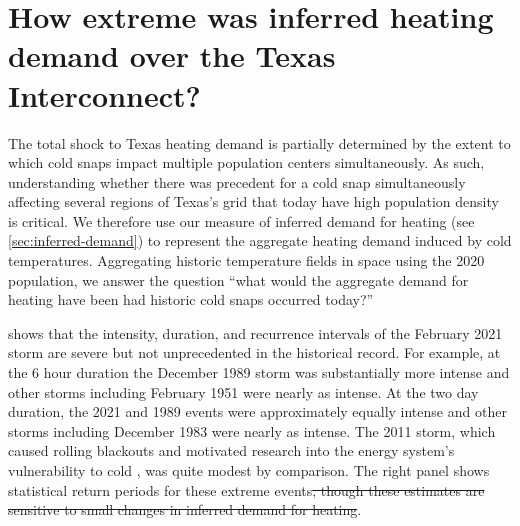 \documentclass[12pt]{iopart}
\providecommand{\DIFadd}[1]{{\protect\color{blue}\uwave{#1}}} %
\providecommand{\DIFdel}[1]{{\protect\color{red}\sout{#1}}}                      %
\providecommand{\DIFaddbegin}{} %
\providecommand{\DIFaddend}{} %
\providecommand{\DIFdelbegin}{} %
\providecommand{\DIFdelend}{} %
\newcommand{\DIFscaledelfig}{0.5}
\newlength{\DIFdelgraphicswidth} %
\newlength{\DIFdelgraphicsheight} %
\newcommand{\DIFaddincludegraphics}[2][]{{\color{blue}\fbox{\DIFOincludegraphics[#1]{#2}}}} %
\newcommand{\DIFdelincludegraphics}[2][]{%
\sbox{\DIFdelgraphicsbox}{\DIFOincludegraphics[#1]{#2}}%
\settoboxwidth{\DIFdelgraphicswidth}{\DIFdelgraphicsbox} %
\settoboxtotalheight{\DIFdelgraphicsheight}{\DIFdelgraphicsbox} %
\scalebox{\DIFscaledelfig}{%
\parbox[b]{\DIFdelgraphicswidth}{\usebox{\DIFdelgraphicsbox}\\[-\baselineskip] \rule{\DIFdelgraphicswidth}{0em}}\llap{\resizebox{\DIFdelgraphicswidth}{\DIFdelgraphicsheight}{%
\setlength{\unitlength}{\DIFdelgraphicswidth}%
\begin{picture}(1,1)%
\thicklines\linethickness{2pt} %
{\color[rgb]{1,0,0}\put(0,0){\framebox(1,1){}}}%
{\color[rgb]{1,0,0}\put(0,0){\line( 1,1){1}}}%
{\color[rgb]{1,0,0}\put(0,1){\line(1,-1){1}}}%
\end{picture}%
}\hspace*{3pt}}} %
} %
\DeclareRobustCommand{\DIFaddbegin}{\DIFOaddbegin \let\includegraphics\DIFaddincludegraphics} %
\DeclareRobustCommand{\DIFaddend}{\DIFOaddend \let\includegraphics\DIFOincludegraphics} %
\DeclareRobustCommand{\DIFdelbegin}{\DIFOdelbegin \let\includegraphics\DIFdelincludegraphics} %
\DeclareRobustCommand{\DIFdelend}{\DIFOaddend \let\includegraphics\DIFOincludegraphics} %
\begin{document}
\section{How extreme was inferred \DIFaddbegin \DIFadd{per capita }\DIFaddend heating demand over the Texas Interconnect?}

The total shock to Texas heating demand is partially determined by the extent to which cold snaps impact multiple population centers simultaneously.
As such, understanding whether there was precedent for a cold snap simultaneously affecting several regions of Texas's grid that today have high population density is critical.
We therefore use our measure of inferred \DIFaddbegin \DIFadd{per capita }\DIFaddend demand for heating (see \cref{sec:inferred-demand}) to represent the aggregate heating demand induced by cold temperatures.
Aggregating historic temperature fields in space using the 2020 population, we answer the question ``what would the aggregate demand for heating have been had historic cold snaps occurred today?''

 shows that the intensity, duration, and recurrence intervals of the February 2021 storm are severe but not unprecedented in the historical record.
For example, at the 6 hour duration the December 1989 storm was substantially more intense and other storms including February 1951 were nearly as intense.
At the two day duration, the 2021 and 1989 events were approximately equally intense and other storms including December 1983 were nearly as intense.
The 2011 storm, which caused rolling blackouts and motivated research into the energy system's vulnerability to cold \cite{ferc_outages:2011}, was quite modest by comparison.
The right panel shows statistical return periods for these extreme events\DIFdelbegin \DIFdel{, though these estimates are sensitive to small changes in inferred demand for heating}\DIFdelend .
\end{document}
